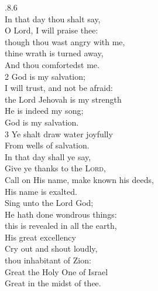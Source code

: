 \documentclass{article}
\begin{document}
\begin{multicols}{2}
.8.6\\


 In that day thou shalt say,\\
O Lord, I will praise thee:\\
though thou wast angry with me,\\ 
thine wrath is turned away,\\
 
\noindent And thou comfortedst me.\\
2 God is my salvation; \\
I will trust, and not be afraid:\\
the Lord Jehovah is my strength\\

\noindent He is indeed my song;\\ 
God is my salvation.\\
3 Ye shalt draw water joyfully\\ 
From wells of salvation.\\

 In that day shall ye say,\\ 
Give ye thanks to the \textsc{Lord},\\ 
Call on His name, make known his deeds,\\
His name is exalted.\\

 Sing unto the Lord God;\\
He hath done wondrous things:\\
this is revealed in all the earth,\\
His great excellency\\

 Cry out and shout loudly,\\
thou inhabitant of Zion:\\
Great the Holy One of Israel\\
Great in the midst of thee.\\

\end{multicols}
\end{document}
